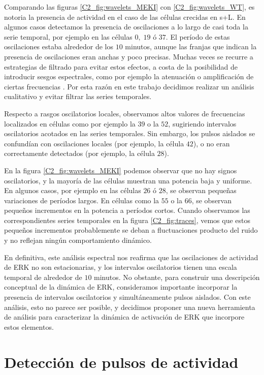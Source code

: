 \documentclass[./main.tex]{subfiles}
\begin{document}
Comparando las figuras \ref{C2_fig:wavelets_MEKI} con \ref{C2_fig:wavelets_WT}, es notoria la presencia de actividad en el caso de las células crecidas en s+L. En algunos casos detectamos la presencia de oscilaciones a lo largo de casi toda la serie temporal, por ejemplo en las células $0,\; 19$ ó $37$. El período de estas oscilaciones estaba alrededor de los $10$ minutos, aunque las franjas que indican la presencia de oscilaciones eran anchas y poco precisas. Muchas veces se recurre a estrategias de filtrado para evitar estos efectos, a costa de la posibilidad de introducir sesgos espectrales, como por ejemplo la atenuación o amplificación de ciertas frecuencias \cite{Monke2020}. Por esta razón en este trabajo decidimos realizar un análisis cualitativo y evitar filtrar las series temporales. 

Respecto a rasgos oscilatorios locales, observamos altos valores de frecuencias localizados en células como por ejemplo la $39$ o la $52$, sugiriendo intervalos oscilatorios acotados en las series temporales. Sin embargo, los pulsos aislados se confundían con oscilaciones locales (por ejemplo, la célula $42$), o no eran correctamente detectados (por ejemplo, la célula $28$). 
 
En la figura \ref{C2_fig:wavelets_MEKI} podemos observar que no hay signos oscilatorios, y la mayoría de las células muestran una potencia baja y uniforme. En algunos casos, por ejemplo en las células $26$ ó $28$, se observan pequeñas variaciones de períodos largos. En células como la $55$ o la $66$, se observan pequeños incrementos en la potencia a períodos cortos. Cuando observamos las correspondientes series temporales en la figura \ref{C2_fig:traces}, vemos que estos pequeños incrementos probablemente se deban a fluctuaciones producto del ruido y no reflejan ningún comportamiento dinámico. 


En definitiva, este análisis espectral nos reafirma que las oscilaciones de actividad de ERK no son estacionarias, y los intervalos oscilatorios tienen una escala temporal de alrededor de $10$ minutos. No obstante, para construir una descripción conceptual de la dinámica de ERK, consideramos importante incorporar la presencia de intervalos oscilatorios y simultáneamente pulsos aislados. Con este análisis, esto no parece ser posible, y decidimos proponer una nueva herramienta de análisis para caracterizar la dinámica de activación de ERK que incorpore estos elementos. 


\section{Detección de pulsos de actividad}
\label{C2_sec:pulse_detection}
\end{document}
